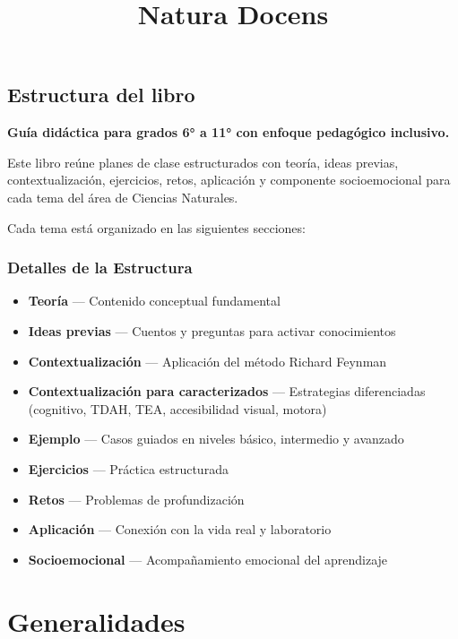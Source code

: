 \documentclass[
  spanish,
  letterpaper,
  12pt,
  oneside,
  open=any]{scrbook}
\title{Natura Docens}
\author{}
\date{}
\providecommand{\tightlist}{%
  \setlength{\itemsep}{0pt}\setlength{\parskip}{0pt}}
\renewcommand*\contentsname{Contenido}
\newcommand\contentsname{Contenido}
\begin{document}
\frontmatter
\maketitle

\renewcommand*\contentsname{Contenido}
{
\setcounter{tocdepth}{0}
\tableofcontents
}

\mainmatter
\chapter{Estructura del libro}\label{estructura-del-libro}

\textbf{Guía didáctica para grados 6° a 11° con enfoque pedagógico
inclusivo.}

Este libro reúne planes de clase estructurados con teoría, ideas
previas, contextualización, ejercicios, retos, aplicación y componente
socioemocional para cada tema del área de Ciencias Naturales.

Cada tema está organizado en las siguientes secciones:

\section{Detalles de la Estructura}\label{detalles-de-la-estructura}

\begin{itemize}
\tightlist
\item
  \textbf{Teoría} --- Contenido conceptual fundamental
\item
  \textbf{Ideas previas} --- Cuentos y preguntas para activar
  conocimientos
\item
  \textbf{Contextualización} --- Aplicación del método Richard Feynman
\item
  \textbf{Contextualización para caracterizados} --- Estrategias
  diferenciadas (cognitivo, TDAH, TEA, accesibilidad visual, motora)
\item
  \textbf{Ejemplo} --- Casos guiados en niveles básico, intermedio y
  avanzado
\item
  \textbf{Ejercicios} --- Práctica estructurada
\item
  \textbf{Retos} --- Problemas de profundización
\item
  \textbf{Aplicación} --- Conexión con la vida real y laboratorio
\item
  \textbf{Socioemocional} --- Acompañamiento emocional del aprendizaje
\end{itemize}

\part{Generalidades}
\end{document}
